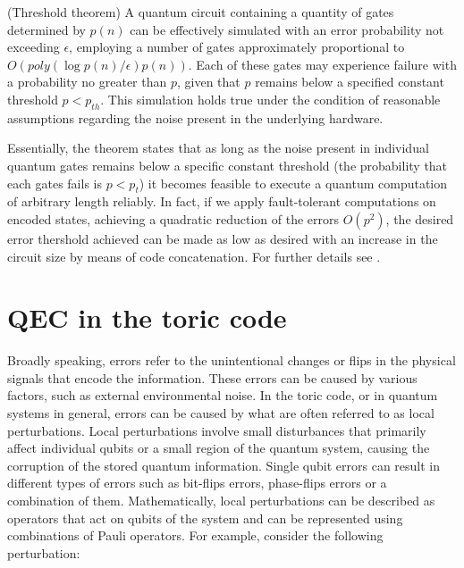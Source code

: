 \documentclass{Configuration_Files/PoliMi3i_thesis}
\begin{document}
\begin{theorem}(Threshold theorem)
	A quantum circuit containing a quantity of gates determined by $p(n)$ can be effectively simulated with an error probability not exceeding $\epsilon$, employing a number of gates approximately proportional to $O(poly(\log p(n)/\epsilon)p(n))$. Each of these gates may experience failure with a probability no greater than $p$, given that $p$ remains below a specified constant threshold $p < p_{th}$. This simulation holds true under the condition of reasonable assumptions regarding the noise present in the underlying hardware.
\end{theorem}

Essentially, the theorem states that as long as the noise present in individual quantum gates remains below a specific constant threshold (the probability that each gates fails is $p<p_t$) it becomes feasible to execute a quantum computation of arbitrary length reliably. In fact, if we apply fault-tolerant computations on encoded states, achieving a quadratic reduction of the errors $O(p^2)$, the desired error thershold achieved can be made as low as desired with an increase in the circuit size by means of code concatenation. For further details see \cite{Nie06}.\newline














\newpage
\section{QEC in the toric code}
\label{sec:TC}

Broadly speaking, errors refer to the unintentional changes or flips in the physical signals that encode the information. These errors can be caused by various factors, such as external environmental noise. In the toric code, or in quantum systems in general, errors can be caused by what are often referred to as local perturbations. Local perturbations involve small disturbances that primarily affect individual qubits or a small region of the quantum system, causing the corruption of the stored quantum information. Single qubit errors can result in different types of errors such as bit-flips errors, phase-flips errors or a combination of them. Mathematically, local perturbations can be described as operators that act on qubits of the system and can be represented using combinations of Pauli operators. For example, consider the following perturbation:
\end{document}
